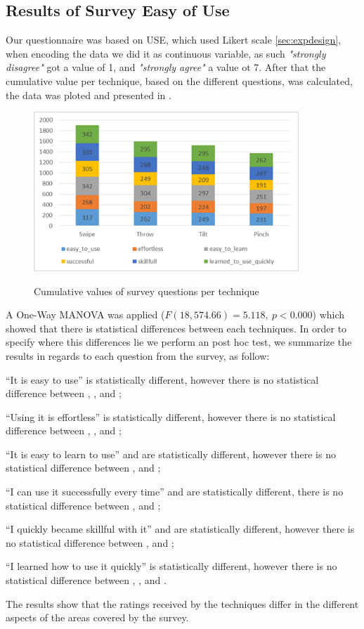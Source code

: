 \subsection{Results of Survey Easy of Use}
Our questionnaire was based on USE, which used Likert scale \ref*{sec:expdesign}, when encoding the data we did it as continuous variable, as such \emph{"strongly disagree"} got a value of 1, and \emph{"strongly agree"} a value ot 7. After that the cumulative value per technique, based on the different questions, was calculated, the data was ploted and presented in . 
\begin{figure}[H]
	{\includegraphics[width = 1\columnwidth , height = 6cm ]{images/survey-data.png}} 
	\caption{
		Cumulative values of survey questions per technique
	}
	\label{fig:surveyResult}
\end{figure}

A One-Way MANOVA was applied ($F(18, 574.66)=5.118,\ p<0.000$) which showed that there is statistical differences between each techniques. 
In order to specify where this differences lie we perform an post hoc test, we summarize the results in regards to each question from the survey, as follow:
\begin{enumerate*}[label=\itshape\arabic*\upshape)]
	\item{``It is easy to use'' \swipe is statistically different, however there is no statistical difference between \throw, \tilt, and \pinch;}
	\item{``Using it is effortless'' \swipe is statistically different, however there is no statistical difference between \throw, \tilt, and \pinch;}
	\item{``It is easy to learn to use''  \swipe and \pinch are statistically different, however there is no statistical difference between \tilt, and \throw;}
	\item{``I can use it successfully every time'' \swipe and \throw are statistically different, there is no statistical difference between \tilt, and \pinch;}
	\item{``I quickly became skillful with it'' \swipe and \throw are statistically different, however there is no statistical difference between \pinch, and \tilt;}
	\item{``I learned how to use it quickly'' \swipe is statistically different, however there is no statistical difference between \throw, \tilt, and \pinch.}
\end{enumerate*}
The results show that the ratings received by the techniques differ in the different aspects of the areas covered by the survey.